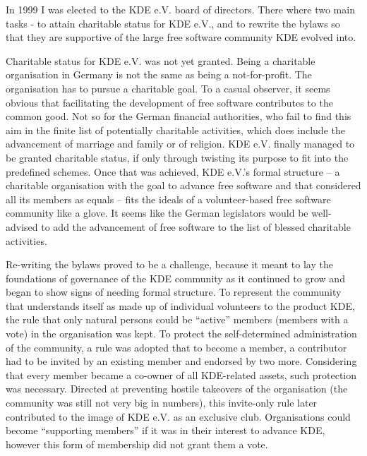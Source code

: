 In 1999 I was elected to the KDE e.V. board of directors. There where
two main tasks - to attain charitable status for KDE
e.V., and to rewrite the bylaws so that they are supportive of
the large free software community KDE evolved into.

Charitable status for KDE e.V. was not yet granted. Being a charitable
organisation in Germany is not the same as being a not-for-profit. The
organisation has to pursue a charitable goal. To a
casual observer, it seems obvious that facilitating the development of
free software contributes to the common good. Not so for the German
financial authorities, who fail to find this aim in the finite
list of potentially charitable activities, which does include the
advancement of marriage and family or of religion. KDE e.V. finally
managed to be granted charitable status, if only through twisting its
purpose to fit into the predefined schemes. Once that was achieved,
KDE e.V.'s formal structure -- a charitable organisation with the goal
to advance free software and that considered all its members as
equals -- fits the ideals of a volunteer-based free software community
like a glove. It seems like the
German legislators would be well-advised to add the advancement of
free software to the list of blessed charitable activities.

Re-writing the bylaws proved to be a challenge, because it meant to
lay the foundations of governance of the KDE community as it continued
to grow and began to show signs of needing formal structure.
To represent the community that understands itself as made up of
individual volunteers to the product KDE, the rule that only natural
persons could be ``active'' members (members with a vote) in the
organisation was kept. To protect the self-determined administration of
the community, a rule was adopted that to become a member, a
contributor had to be invited by an existing member and endorsed by
two more. Considering that every member became a co-owner of all
KDE-related assets, such protection was necessary. Directed at
preventing hostile takeovers of the organisation 
(the community was still not very big in numbers), this invite-only
rule later contributed to the image of KDE e.V. as an exclusive
club. Organisations could become ``supporting members'' if it was in
their interest to advance KDE, however this form of membership did not
grant them a vote.

